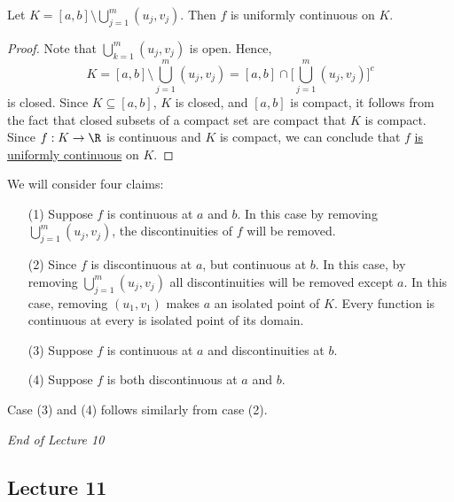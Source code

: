 \begin{lemma}[Claim 2]
    Let \( K = [a,b] \setminus  \bigcup_{ j=1 }^{ m } ({u}_{j}, {v}_{j})  \). Then \( f \) is uniformly continuous on \( K  \).
\end{lemma}
\begin{proof}
Note that \( \bigcup_{ k=1  }^{ m } ({u}_{j}, {v}_{j})   \) is open. Hence, 
\[  K = [a,b] \setminus  \bigcup_{ j=1  }^{ m }  ({u}_{j}, {v}_{j}) = [a,b] \cap \Big[ \bigcup_{ j=1  }^{ m }  ({u}_{j}, {v}_{j}) \Big]^{c} \]
is closed. Since \( K \subseteq  [a,b] \), \( K  \) is closed, and \( [a,b]  \) is compact, it follows from the fact that closed subsets of a compact set are compact that \( K  \) is compact. Since \( f: K \to \R  \) is continuous and \( K  \) is compact, we can conclude that \( f  \) {\hyperref[is uniformly continuous]{is uniformly continuous}} on \( K  \).
\end{proof}

\begin{remark}\label{is uniformly continuous}
   We will consider four claims:
   \begin{enumerate}
       \item[(1)] Suppose \( f  \) is continuous at \( a \) and \( b  \). In this case by removing \( \bigcup_{ j=1  }^{ m }  ({u}_{j}, {v}_{j})  \), the discontinuities of \( f  \) will be removed.
        \item[(2)] Since \( f  \) is discontinuous at \( a \), but continuous at \( b  \). In this case, by removing \( \bigcup_{ j=1 }^{ m } ({u}_{j},{v}_{j}) \) all discontinuities will be removed except \( a \). In this case, removing \( ({u}_{1}, {v}_{1}) \) makes \( a \) an isolated point of \( K  \). Every function is continuous at every is isolated point of its domain.
        \item[(3)] Suppose \( f \) is continuous at \( a \) and discontinuities at \( b \).
        \item[(4)] Suppose \( f \) is both discontinuous at \( a \) and \( b \).
   \end{enumerate}
   Case (3) and (4) follows similarly from case (2).
\end{remark}

\begin{center}
    \textit{End of Lecture 10} 
\end{center}



\subsection{Lecture 11}


